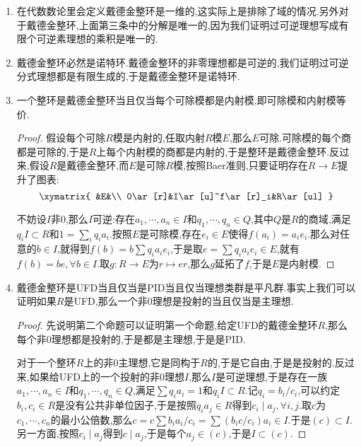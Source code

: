 \begin{enumerate}
	\item 在代数数论里会定义戴德金整环是一维的,这实际上是排除了域的情况.另外对于戴德金整环,上面第三条中的分解是唯一的,因为我们证明过可逆理想写成有限个可逆素理想的乘积是唯一的.
	\item 戴德金整环必然是诺特环.戴德金整环的非零理想都是可逆的,我们证明过可逆分式理想都是有限生成的,于是戴德金整环是诺特环.
	\item 一个整环是戴德金整环当且仅当每个可除模都是内射模,即可除模和内射模等价.
	\begin{proof}
		
		假设每个可除$R$模是内射的,任取内射$R$模$E$,那么$E$可除.可除模的每个商都是可除的,于是$R$上每个内射模的商都是内射的,于是整环是戴德金整环.反过来,假设$R$是戴德金整环,而$E$是可除$R$模,按照Baer准则,只要证明存在$R\to E$提升了图表:
		$$\xymatrix{
			&E&\\
			0\ar[r]&I\ar[u]^f\ar[r]_i&R\ar[ul]
		}$$
		
		不妨设$I$非0,那么$I$可逆:存在$a_1,\cdots,a_n\in I$和$q_1,\cdots,q_n\in Q$,其中$Q$是$R$的商域,满足$q_iI\subset R$和$1=\sum_iq_ia_i$.按照$E$是可除模,存在$e_i\in E$使得$f(a_i)=a_ie_i$.那么对任意的$b\in I$,就得到$f(b)=b\sum q_ia_ie_i$,于是取$e=\sum q_ia_ie_i\in E$,就有$f(b)=be,\forall b\in I$.取$g:R\to E$为$r\mapsto er$,那么$g$延拓了$f$,于是$E$是内射模.
	\end{proof}
    \item 戴德金整环是UFD当且仅当是PID当且仅当理想类群是平凡群.事实上我们可以证明如果$R$是UFD,那么一个非0理想是投射的当且仅当是主理想.
    \begin{proof}
    	
    	先说明第二个命题可以证明第一个命题,给定UFD的戴德金整环$R$,那么每个非0理想都是投射的,于是都是主理想,于是是PID.
    	
    	对于一个整环$R$上的非0主理想,它是同构于$R$的,于是它自由,于是是投射的.反过来,如果给UFD上的一个投射的非0理想$I$,那么$I$是可逆理想,于是存在一族$a_1,\cdots,a_n\in I$和$q_1,\cdots,q_n\in Q$,满足$\sum q_ia_i=1$和$q_iI\subset R$.记$q_i=b_i/c_i$,可以约定$b_i,c_i\in R$是没有公共非单位因子,于是按照$q_ia_j\in R$得到$c_i\mid a_j,\forall i,j$.取$c$为$c_1,\cdots,c_n$的最小公倍数,那么$c=c\sum b_ia_i/c_i=\sum(b_ic/c_i)a_i\in I$.于是$(c)\subset I$.另一方面,按照$c_i\mid a_j$得到$c\mid a_j$,于是每个$a_j\in (c)$,于是$I\subset (c)$.
    \end{proof}
\end{enumerate}

